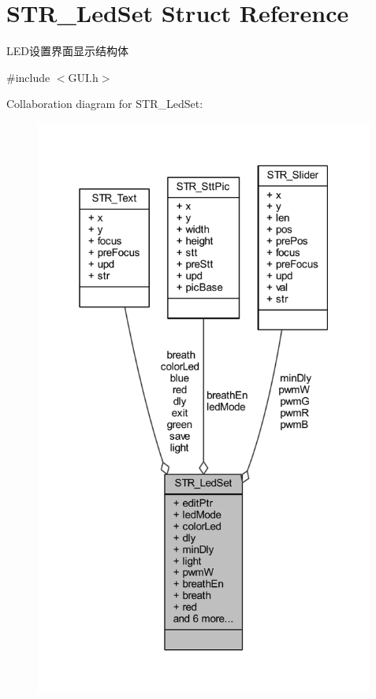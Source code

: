 \hypertarget{struct_s_t_r___led_set}{\section{\-S\-T\-R\-\_\-\-Led\-Set \-Struct \-Reference}
\label{struct_s_t_r___led_set}
}


\-L\-E\-D设置界面显示结构体  




{\ttfamily \#include $<$\-G\-U\-I.\-h$>$}



\-Collaboration diagram for \-S\-T\-R\-\_\-\-Led\-Set\-:\nopagebreak
\begin{figure}[H]
\begin{center}
\leavevmode
\includegraphics[width=316pt]{struct_s_t_r___led_set__coll__graph}
\end{center}
\end{figure}
